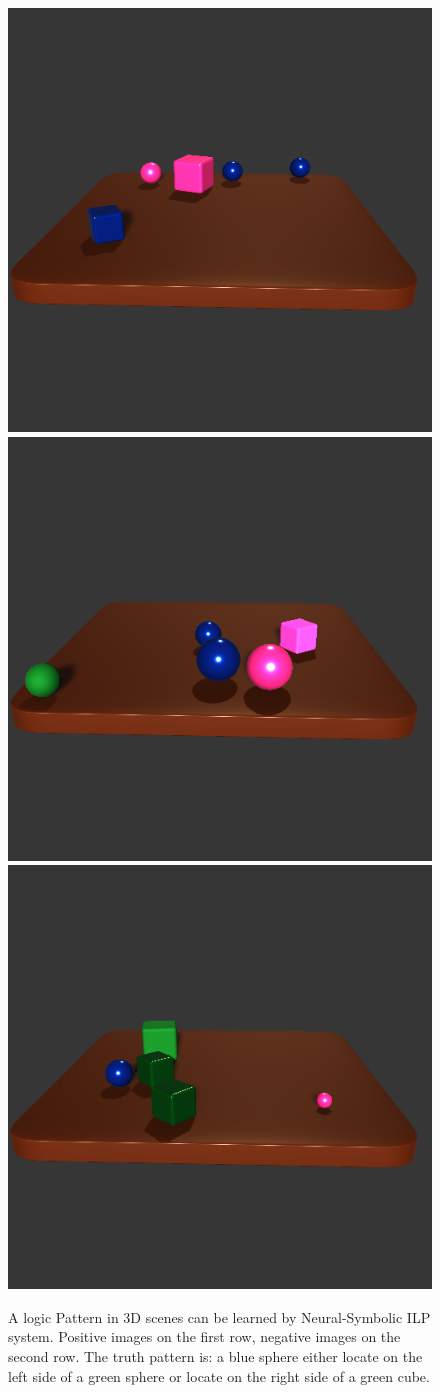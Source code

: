 \documentclass[
]{ceurart}
\begin{document}
\begin{figure}[t]
\begin{minipage}{0.4\textwidth}
			\includegraphics[width=0.3\linewidth]{img/intro_hide/false1.png} 
			\includegraphics[width=0.3\linewidth]{img/intro_hide/false2.png}
			\includegraphics[width=0.3\linewidth]{img/intro_hide/false3.png}
			\label{fig:intro-hide}
		\end{minipage}
		\caption{A logic Pattern in 3D scenes can be learned by Neural-Symbolic ILP system. Positive images on the first row, negative images on the second row. The truth pattern is: a blue sphere either locate on the left side of a green sphere or locate on the right side of a green cube.}
	\end{figure}
				
\end{document}
